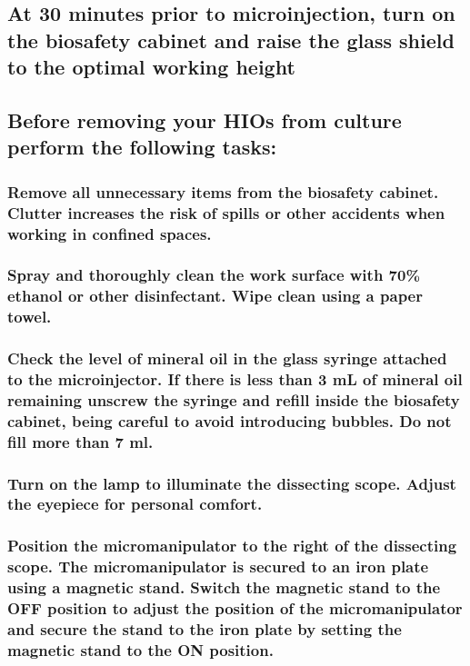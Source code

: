 \documentclass[11pt]{article}
\begin{document}
\subsection{{\sffamily } At 30 minutes prior to microinjection, turn on the biosafety cabinet and raise the glass shield to the optimal working height}
\label{sec:orgheadline14}
\subsection{{\sffamily } Before removing your HIOs from culture perform the following tasks:}
\label{sec:orgheadline41}
\subsubsection{{\sffamily } Remove all unnecessary items from the biosafety cabinet. Clutter increases the risk of spills or other accidents when working in confined spaces.}
\label{sec:orgheadline15}
\subsubsection{{\sffamily } Spray and thoroughly clean the work surface with 70\% ethanol or other disinfectant. Wipe clean using a paper towel.}
\label{sec:orgheadline16}
\subsubsection{{\sffamily } Check the level of mineral oil in the glass syringe attached to the microinjector. If there is less than 3 mL of mineral oil remaining unscrew the syringe and refill inside the biosafety cabinet, being careful to avoid introducing bubbles. Do not fill more than 7 ml.}
\label{sec:orgheadline17}
\subsubsection{{\sffamily } Turn on the lamp to illuminate the dissecting scope. Adjust the eyepiece for personal comfort.}
\label{sec:orgheadline18}
\subsubsection{{\sffamily } Position the micromanipulator to the right of the dissecting scope. The micromanipulator is secured to an iron plate using a magnetic stand. Switch the magnetic stand to the OFF position to adjust the position of the micromanipulator and secure the stand to the iron plate by setting the magnetic stand to the ON position.}
\label{sec:orgheadline19}
\end{document}
